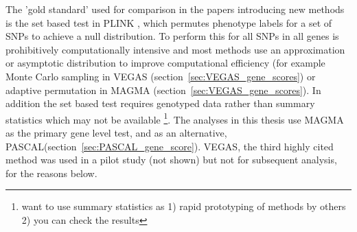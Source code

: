 The 'gold standard' used for comparison in the papers introducing new methods \cite{liu2010versatile}\cite{de2015magma}\cite{lamparter2016fast} is the set based test in PLINK \cite{purcell2007plink}, which permutes phenotype labels for a set of SNPs to achieve a null distribution. To perform this for all SNPs in all genes is prohibitively computationally intensive and most methods use an approximation or asymptotic distribution to improve computational efficiency (for example Monte Carlo sampling in VEGAS (section~\ref{sec:VEGAS_gene_scores}) or adaptive permutation in MAGMA (section~\ref{sec:VEGAS_gene_scores}). In addition the set based test requires genotyped data rather than summary statistics which may not be available  \footnote{want to use summary statistics as 1) rapid prototyping of methods by others 2) you can check the results}. The analyses in this thesis use MAGMA \cite{de2015magma} as the primary gene level test, and as an alternative, PASCAL\cite{lamparter2016fast}(section~\ref{sec:PASCAL_gene_score}). VEGAS, the third highly cited method  was used in a pilot study (not shown)\cite{liu2010versatile} but not for subsequent analysis, for the reasons below.  


